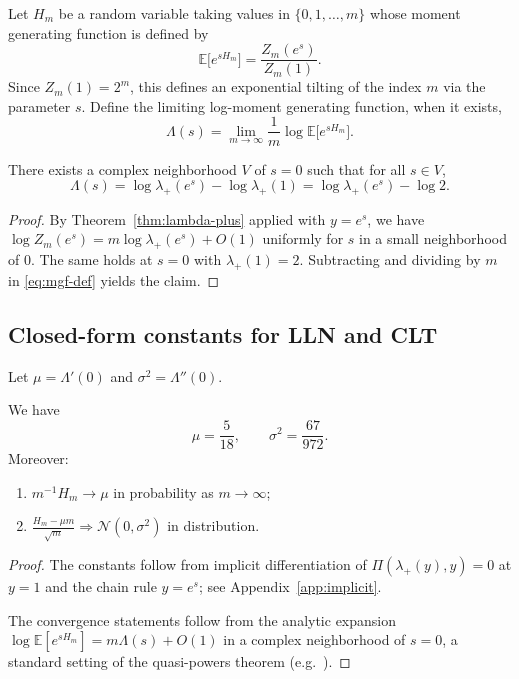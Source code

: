 Let \(H_m\) be a random variable taking values in \(\{0,1,\dots,m\}\) whose moment generating function is defined by
\begin{equation}\label{eq:mgf-def}
\mathbb{E}\bigl[e^{sH_m}\bigr]=\frac{Z_m(e^s)}{Z_m(1)}.
\end{equation}
Since \(Z_m(1)=2^m\), this defines an exponential tilting of the index \(m\) via the parameter \(s\).
Define the limiting log-moment generating function, when it exists,
\[
\Lambda(s)=\lim_{m\to\infty}\frac{1}{m}\log \mathbb{E}\bigl[e^{sH_m}\bigr].
\]

\begin{theorem}\label{thm:lambda-mgf}
There exists a complex neighborhood \(V\) of \(s=0\) such that for all \(s\in V\),
\[
\Lambda(s)=\log \lambda_+(e^s)-\log \lambda_+(1)=\log \lambda_+(e^s)-\log 2.
\]
\end{theorem}

\begin{proof}
By Theorem~\ref{thm:lambda-plus} applied with \(y=e^s\), we have
\(\log Z_m(e^s)=m\log \lambda_+(e^s)+O(1)\) uniformly for \(s\) in a small neighborhood of \(0\).
The same holds at \(s=0\) with \(\lambda_+(1)=2\).
Subtracting and dividing by \(m\) in \eqref{eq:mgf-def} yields the claim.
\end{proof}

\subsection{Closed-form constants for LLN and CLT}

Let \(\mu=\Lambda'(0)\) and \(\sigma^2=\Lambda''(0)\).

\begin{theorem}\label{thm:lln-clt}
We have
\[
\mu=\frac{5}{18},\qquad \sigma^2=\frac{67}{972}.
\]
Moreover:
\begin{enumerate}
  \item \(m^{-1}H_m\to \mu\) in probability as \(m\to\infty\);
  \item \(\displaystyle \frac{H_m-\mu m}{\sqrt{m}}\Rightarrow \mathcal{N}(0,\sigma^2)\) in distribution.
\end{enumerate}
\end{theorem}

\begin{proof}
The constants follow from implicit differentiation of \(\Pi(\lambda_+(y),y)=0\) at \(y=1\) and the chain rule \(y=e^s\); see Appendix~\ref{app:implicit}.

The convergence statements follow from the analytic expansion \(\log \mathbb{E}[e^{sH_m}]=m\Lambda(s)+O(1)\) in a complex neighborhood of \(s=0\), a standard setting of the quasi-powers theorem (e.g.\ \cite{Hwang1998,FlajoletSedgewick2009}).
\end{proof}

